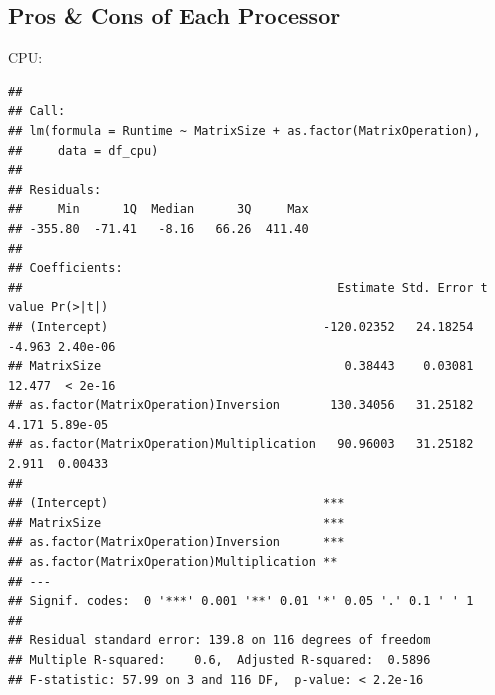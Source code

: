 \documentclass[
]{article}
\newenvironment{Shaded}{\begin{snugshade}}{\end{snugshade}}
\newcommand{\DataTypeTok}[1]{\textcolor[rgb]{0.13,0.29,0.53}{#1}}
\newcommand{\DecValTok}[1]{\textcolor[rgb]{0.00,0.00,0.81}{#1}}
\newcommand{\KeywordTok}[1]{\textcolor[rgb]{0.13,0.29,0.53}{\textbf{#1}}}
\newcommand{\NormalTok}[1]{#1}
\newcommand{\OperatorTok}[1]{\textcolor[rgb]{0.81,0.36,0.00}{\textbf{#1}}}
\newcommand{\StringTok}[1]{\textcolor[rgb]{0.31,0.60,0.02}{#1}}
\begin{document}
\hypertarget{pros-cons-of-each-processor}{%
\subsection{Pros \& Cons of Each
Processor}\label{pros-cons-of-each-processor}}

CPU:

\begin{Shaded}
\end{Shaded}

\begin{verbatim}
## 
## Call:
## lm(formula = Runtime ~ MatrixSize + as.factor(MatrixOperation), 
##     data = df_cpu)
## 
## Residuals:
##     Min      1Q  Median      3Q     Max 
## -355.80  -71.41   -8.16   66.26  411.40 
## 
## Coefficients:
##                                            Estimate Std. Error t value Pr(>|t|)
## (Intercept)                              -120.02352   24.18254  -4.963 2.40e-06
## MatrixSize                                  0.38443    0.03081  12.477  < 2e-16
## as.factor(MatrixOperation)Inversion       130.34056   31.25182   4.171 5.89e-05
## as.factor(MatrixOperation)Multiplication   90.96003   31.25182   2.911  0.00433
##                                             
## (Intercept)                              ***
## MatrixSize                               ***
## as.factor(MatrixOperation)Inversion      ***
## as.factor(MatrixOperation)Multiplication ** 
## ---
## Signif. codes:  0 '***' 0.001 '**' 0.01 '*' 0.05 '.' 0.1 ' ' 1
## 
## Residual standard error: 139.8 on 116 degrees of freedom
## Multiple R-squared:    0.6,  Adjusted R-squared:  0.5896 
## F-statistic: 57.99 on 3 and 116 DF,  p-value: < 2.2e-16
\end{verbatim}

\begin{Shaded}
\end{Shaded}
\end{document}
